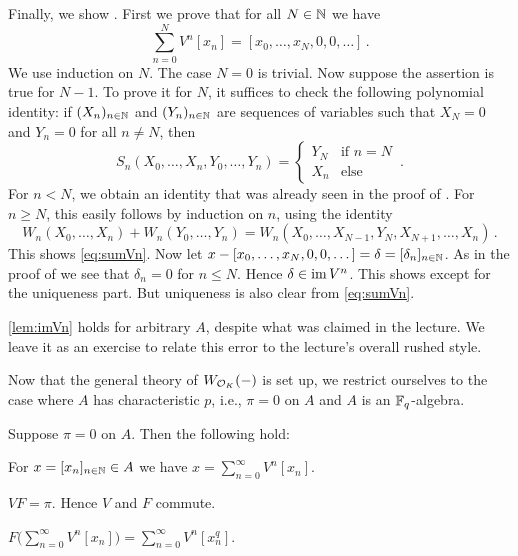 \documentclass[a4paper, 10pt, oneside, DIV=9, chapterprefix=true, numbers=enddot,bibliography=totoc]{scrbook}
\begin{document}
\begin{proof*}
	Finally, we show . First we prove that for all $N\in \mathbb{N}$ we have
	\begin{equation}\label{eq:sumVn}
		\sum_{n=0}^NV^n[x_n]=[x_0,\dotsc,x_N,0,0,\dotsc]\,.
	\end{equation}
	We use induction on $N$. The case $N=0$ is trivial. Now suppose the assertion is true for $N-1$. To prove it for $N$, it suffices to check the following polynomial identity: if $(X_n)_{n\in\mathbb{N}}$ and $(Y_n)_{n\in\mathbb{N}}$ are sequences of variables such that $X_N=0$ and $Y_n=0$ for all $n\neq N$, then
	\begin{equation*}
		S_n(X_0,\dotsc,X_n,Y_0,\dotsc,Y_n)=\begin{cases}
		Y_N&\text{if }n= N\\
		X_n&\text{else}
		\end{cases}\,.
	\end{equation*}
	For $n<N$, we obtain an identity that was already seen in the proof of . For $n\geq N$, this easily follows by induction on $n$, using the identity
	\begin{equation*}
		W_n(X_0,\dotsc,X_n)+W_n(Y_0,\dotsc,Y_n)=W_n(X_0,\dotsc,X_{N-1},Y_N,X_{N+1},\dotsc,X_n)\,.
	\end{equation*}
	This shows \cref{eq:sumVn}. Now let $x-[x_0,\dotsc,x_N,0,0,\dotsc]=\delta=[\delta_n]_{n\in\mathbb{N}}$. As in the proof of  we see that $\delta_n=0$ for $n\leq N$. Hence $\delta\in\operatorname{im} V^n$. This shows  except for the uniqueness part. But uniqueness is also clear from \cref{eq:sumVn}.
\end{proof*}
\begin{urem*}
	\cref{lem:imVn} holds for arbitrary $A$, despite what was claimed in the lecture. We leave it as an exercise to relate this error to the lecture's overall rushed style.
\end{urem*}
Now that the general theory of $W_{\mathcal{O}_K}(-)$ is set up, we restrict ourselves to the case where $A$ has characteristic $p$, i.e., $\pi=0$ on $A$ and $A$ is an $\mathbb{F}_q$-algebra.
\begin{lem}\label{lem:Vincharp}
	Suppose $\pi=0$ on $A$. Then the following hold:
	\begin{numerate}
		\item For $x=[x_n]_{n\in\mathbb{N}}\in A$ we have $x=\sum_{n=0}^\infty V^n[x_n]$.
		\item $VF=\pi$. Hence $V$ and $F$ commute.
		\item $F\big(\sum_{n=0}^\infty V^n[x_n]\big)=\sum_{n=0}^\infty V^n[x_n^q]$.
	\end{numerate}
\end{lem}
\end{document}

